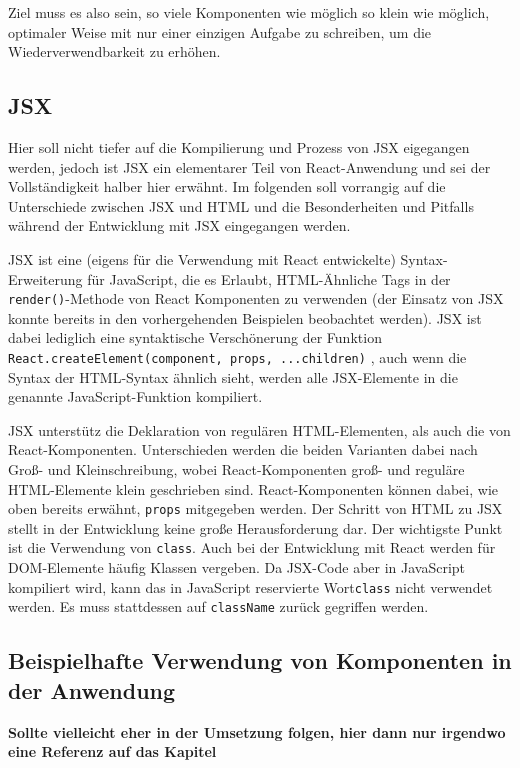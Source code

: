 Ziel muss es also sein, so viele Komponenten wie möglich so klein wie möglich, optimaler Weise mit nur einer einzigen Aufgabe zu schreiben, um die Wiederverwendbarkeit zu erhöhen.

\subsection{JSX}
Hier soll nicht tiefer auf die Kompilierung und Prozess von JSX eigegangen werden, jedoch ist JSX ein elementarer Teil von React-Anwendung und sei der Vollständigkeit halber hier erwähnt. Im folgenden soll vorrangig auf die Unterschiede zwischen JSX und HTML und die Besonderheiten und Pitfalls während der Entwicklung mit JSX eingegangen werden.

JSX ist eine (eigens für die Verwendung mit React entwickelte) Syntax-Erweiterung für JavaScript, die es Erlaubt, HTML-Ähnliche Tags in der \verb|render()|-Methode von React Komponenten zu verwenden (der Einsatz von JSX konnte bereits in den vorhergehenden Beispielen beobachtet werden).
JSX ist dabei lediglich eine syntaktische Verschönerung der Funktion \verb|React.createElement(component, props, ...children)| \cite{ReactJSX}, auch wenn die Syntax der HTML-Syntax ähnlich sieht, werden alle JSX-Elemente in die genannte JavaScript-Funktion kompiliert.

JSX unterstütz die Deklaration von regulären HTML-Elementen, als auch die von React-Komponenten. Unterschieden werden die beiden Varianten dabei nach Groß- und Kleinschreibung, wobei React-Komponenten groß- und reguläre HTML-Elemente klein geschrieben sind.
React-Komponenten können dabei, wie oben bereits erwähnt, \verb|props| mitgegeben werden.
Der Schritt von HTML zu JSX stellt in der Entwicklung keine große Herausforderung dar.
Der wichtigste Punkt ist die Verwendung von \verb|class|. Auch bei der Entwicklung mit React werden für DOM-Elemente häufig Klassen vergeben. Da JSX-Code aber in JavaScript kompiliert wird, kann das in JavaScript reservierte Wort\footnotemark \verb|class|  nicht verwendet werden. Es muss stattdessen auf \verb|className| zurück gegriffen werden.


\subsection{Beispielhafte Verwendung von Komponenten in der Anwendung}
\textbf{Sollte vielleicht eher in der Umsetzung folgen, hier dann nur irgendwo eine Referenz auf das Kapitel}

